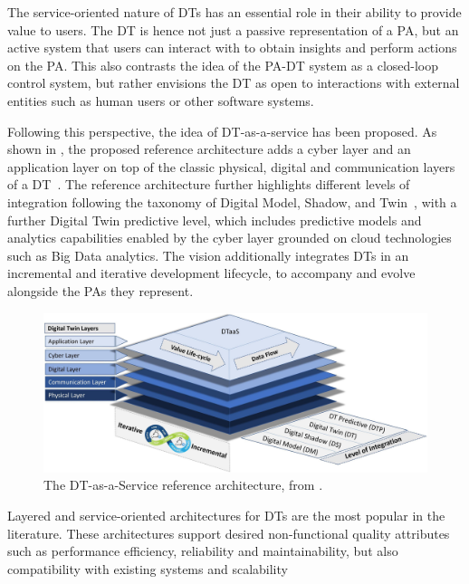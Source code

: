 The service-oriented nature of \acp{DT} has an essential role in their ability to provide value to users.
%
The \ac{DT} is hence not just a passive representation of a \ac{PA}, but an active system that users can interact with to obtain insights and perform actions on the \ac{PA}.
%
This also contrasts the idea of the \ac{PA}-\ac{DT} system as a closed-loop control system, but rather envisions the \ac{DT} as open to interactions with external entities such as human users or other software systems.

Following this perspective, the idea of \ac{DT}-as-a-service has been proposed.
As shown in , the proposed reference architecture adds a cyber layer and an application layer on top of the classic physical, digital and communication layers of a \ac{DT}~\cite{aheleroff2021aei}.
%
The reference architecture further highlights different levels of integration following the taxonomy of Digital Model, Shadow, and Twin~\cite{kritzinger2018dtmanufacturing}, with a further Digital Twin predictive level, which includes predictive models and analytics capabilities enabled by the cyber layer grounded on cloud technologies such as Big Data analytics. 
%
The vision additionally integrates \acp{DT} in an incremental and iterative development lifecycle, to accompany and evolve alongside the \acp{PA} they represent. 

\begin{figure}[t]
    \centering
    \includegraphics[width=\textwidth]{figures/dt-as-a-service.jpg}
    \caption{The DT-as-a-Service reference architecture, from \cite{aheleroff2021aei}.}
    \label{fig:dt-as-a-service}
\end{figure}

Layered and service-oriented architectures for \acp{DT} are the most popular in the literature.
%
These architectures support desired non-functional quality attributes such as performance efficiency, reliability and maintainability, but also compatibility with existing systems and scalability~\cite{ferko2022architecting}


